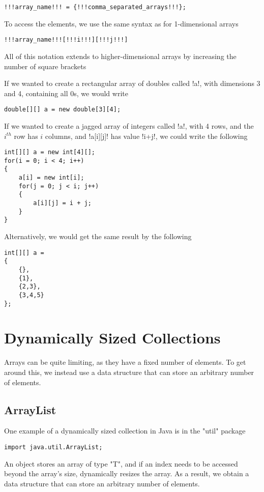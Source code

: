\documentclass[11pt]{report}
\begin{document}
\begin{lstlisting}[style=javaSyntax]
!!!array_name!!! = {!!!comma_separated_arrays!!!}; 
\end{lstlisting}
\pagebreak
To access the elements, we use the same syntax as for 1-dimensional arrays
\vspace{-20pt}
\begin{lstlisting}[style=javaSyntax]
!!!array_name!!![!!!i!!!][!!!j!!!] 
\end{lstlisting}
All of this notation extends to higher-dimensional arrays by increasing the number of square brackets
\begin{egs} If we wanted to create a rectangular array of doubles called \inlineJava!a!, with dimensions 3 and 4, containing all 0s, we would write
\vspace{-15pt}
\begin{lstlisting}
double[][] a = new double[3][4];
\end{lstlisting}
If we wanted to create a jagged array of integers called \inlineJava!a!, with 4 rows, and the $i^{th}$ row has $i$ columns, and \inlineJava!a[i][j]! has value \inlineJava!i+j!, we could write the following
\vspace{-15pt}
\begin{lstlisting}
int[][] a = new int[4][];
for(i = 0; i < 4; i++)
{
    a[i] = new int[i];
    for(j = 0; j < i; j++)
    {
        a[i][j] = i + j;
    }
}
\end{lstlisting}
Alternatively, we would get the same result by the following
\vspace{-15pt}
\begin{lstlisting}
int[][] a = 
{
    {},
    {1},
    {2,3},
    {3,4,5}
};
\end{lstlisting}
\end{egs}
\pagebreak
\section{Dynamically Sized Collections}
Arrays can be quite limiting, as they have a fixed number of elements. To get around this, we instead use a data structure that can store an arbitrary number of elements.
\subsection{ArrayList}
One example of a dynamically sized collection in Java is  in the \inline"util" package
\vspace{-15pt}
\begin{lstlisting}
import java.util.ArrayList;
\end{lstlisting}
An  object stores an array of type \inlineJava"T", and if an index needs to be accessed beyond the array's size, dynamically resizes the array. As a result, we obtain a data structure that can store an arbitrary number of elements.
\pagebreak
\end{document}
